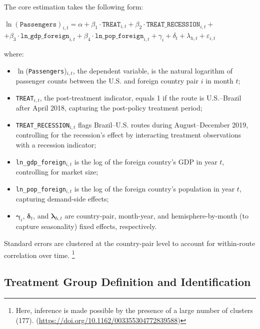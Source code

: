 \documentclass[12pt]{article}
\begin{document}
The core estimation takes the following form:
\begin{mybox}
\begin{center}

$\ln(\texttt{Passengers})_{i,t} = \alpha + \beta_1 \cdot \texttt{TREAT}_{i,t} + \beta_2 \cdot \texttt{TREAT\_RECESSION}_{i,t} + $\\

$+\beta_3 \cdot \texttt{ln\_gdp\_foreign}_{i,t} + \beta_4 \cdot \texttt{ln\_pop\_foreign}_{i,t} + \gamma_i + \delta_t + \lambda_{h,t} + \varepsilon_{i,t}$

\end{center}
\end{mybox}

\noindent where:

\begin{itemize}[leftmargin=*]
\item $\ln$(\texttt{Passengers})$_{i,t}$, the dependent variable, is the natural logarithm of passenger counts between the U.S. and foreign country pair $i$ in month $t$;
\item \texttt{TREAT}$_{i,t}$, the post-treatment indicator, equals 1 if the route is U.S.–Brazil after April 2018, capturing the post-policy treatment period;
\item \texttt{TREAT\_RECESSION}$_{i,t}$ flags Brazil–U.S. routes during August–December 2019, controlling for the recession’s effect by interacting treatment observations with a recession indicator;
\item \texttt{ln\_gdp\_foreign}$_{i,t}$ is the log of the foreign country’s GDP in year $t$, controlling for market size;
\item \texttt{ln\_pop\_foreign}$_{i,t}$ is the log of the foreign country’s population in year $t$, capturing demand-side effects;
\item $\boldsymbol{\gamma}_i$, $\boldsymbol{\delta}_t$, and $\boldsymbol\lambda_{h,t}$ are country-pair, month-year, and hemisphere-by-month (to capture seasonality) fixed effects, respectively.
\end{itemize}

Standard errors are clustered at the country-pair level to account for within-route correlation over time. \footnote{Here, inference is made possible by the presence of a large number of clusters (177). (\url{https://doi.org/10.1162/003355304772839588})}

\subsection{Treatment Group Definition and Identification}
\end{document}
